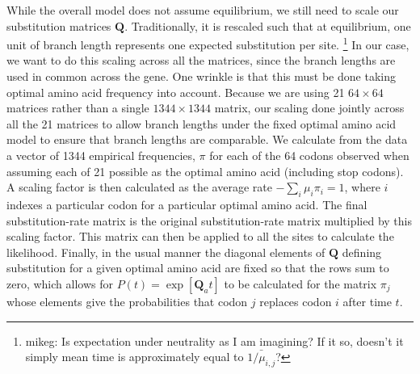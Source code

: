 \documentclass{article}
\newcommand{\Pij}{\ensuremath{\pi_{j}}\xspace}
\newcommand{\Qmatrix}{\mathbf{Q}\xspace}
\newcommand{\Qmatrixa}{\ensuremath{\Qmatrix_a}\xspace}
\newcommand{\muij}{\ensuremath{\mu_{i,j}}\xspace}
\begin{document}
While the overall model does not assume equilibrium, we still need to scale our substitution matrices $\Qmatrix$.
Traditionally, it is rescaled such that at equilibrium, one unit of branch length represents one expected substitution per site.
\footnote{mikeg: Is expectation under neutrality as I am imagining?
If it so, doesn't it simply mean time is approximately equal to $\bar{1/\muij}$?
}
In our case, we want to do this scaling across all the matrices, since the branch lengths are used in common across the gene.
One wrinkle is that this must be done taking optimal amino acid frequency into account. 
Because we are using 21 $64 \times 64$ matrices rather than a single $1344 \times 1344$ matrix, our scaling done jointly across all the 21 matrices to allow branch lengths under the fixed optimal amino acid model to ensure that branch lengths are comparable.
We calculate from the data a vector of 1344 empirical frequencies, $\pi$ for each of the 64 codons observed when assuming each of 21 possible as the optimal amino acid (including stop codons).
A scaling factor is then calculated as the average rate $-\sum_i \mu_i \pi_i=1$, where $i$ indexes a particular codon for a particular optimal amino acid.
The final substitution-rate matrix is the original substitution-rate matrix multiplied by this scaling factor.
This matrix can then be applied to all the sites to calculate the likelihood. 
Finally, in the usual manner the diagonal elements of $\Qmatrix$ defining substitution for a given optimal amino acid are fixed so that the rows sum to zero, which allows for $P(t) = \exp\left[\Qmatrixa t\right]$ to be calculated for the matrix $\Pij$ whose elements give the probabilities that codon $j$ replaces codon $i$ after time $t$. 
\end{document}
